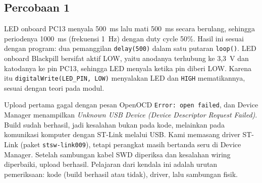 \subsection{Percobaan 1}
LED onboard PC13 menyala 500~ms lalu mati 500~ms secara berulang, sehingga periodenya 1000~ms (frekuensi 1~Hz) dengan duty cycle 50\%. Hasil ini sesuai dengan program: dua pemanggilan \texttt{delay(500)} dalam satu putaran \texttt{loop()}. LED onboard Blackpill bersifat aktif LOW, yaitu anodanya terhubung ke 3,3~V dan katodanya ke pin PC13, sehingga LED menyala ketika pin diberi LOW. Karena itu \texttt{digitalWrite(LED\_PIN, LOW)} menyalakan LED dan \texttt{HIGH} mematikannya, sesuai dengan teori pada modul.

Upload pertama gagal dengan pesan OpenOCD \texttt{Error: open failed}, dan Device Manager menampilkan \emph{Unknown USB Device (Device Descriptor Request Failed)}. Build sudah berhasil, jadi kesalahan bukan pada kode, melainkan pada komunikasi komputer dengan ST-Link melalui USB. Kami memasang driver ST-Link (paket \texttt{stsw-link009}), tetapi perangkat masih bertanda seru di Device Manager. Setelah sambungan kabel SWD diperiksa dan kesalahan wiring diperbaiki, upload berhasil. Pelajaran dari kendala ini adalah urutan pemeriksaan: kode (build berhasil atau tidak), driver, lalu sambungan fisik.

